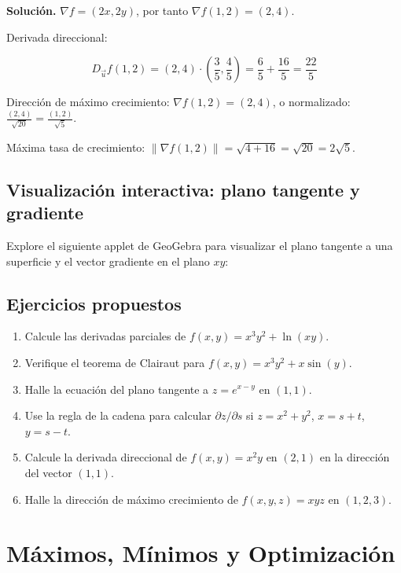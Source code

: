 \documentclass[
]{book}
\providecommand{\tightlist}{%
  \setlength{\itemsep}{0pt}\setlength{\parskip}{0pt}}
\begin{document}
\textbf{Solución.} \(\nabla f = (2x, 2y)\), por tanto \(\nabla f(1, 2) = (2, 4)\).

Derivada direccional:

\[
D_{\vec{u}} f(1, 2) = (2, 4) \cdot \left(\frac{3}{5}, \frac{4}{5}\right) = \frac{6}{5} + \frac{16}{5} = \frac{22}{5}
\]

Dirección de máximo crecimiento: \(\nabla f(1, 2) = (2, 4)\), o normalizado: \(\frac{(2, 4)}{\sqrt{20}} = \frac{(1, 2)}{\sqrt{5}}\).

Máxima tasa de crecimiento: \(\|\nabla f(1, 2)\| = \sqrt{4 + 16} = \sqrt{20} = 2\sqrt{5}\).

\section{Visualización interactiva: plano tangente y gradiente}\label{visualizaciuxf3n-interactiva-plano-tangente-y-gradiente}

Explore el siguiente applet de GeoGebra para visualizar el plano tangente a una superficie y el vector gradiente en el plano \(xy\):

\section{Ejercicios propuestos}\label{ejercicios-propuestos-3}

\begin{enumerate}
\def\labelenumi{\arabic{enumi}.}
\tightlist
\item
  Calcule las derivadas parciales de \(f(x, y) = x^3 y^2 + \ln(xy)\).
\item
  Verifique el teorema de Clairaut para \(f(x, y) = x^3 y^2 + x\sin(y)\).
\item
  Halle la ecuación del plano tangente a \(z = e^{x-y}\) en \((1, 1)\).
\item
  Use la regla de la cadena para calcular \(\partial z / \partial s\) si \(z = x^2 + y^2\), \(x = s + t\), \(y = s - t\).
\item
  Calcule la derivada direccional de \(f(x, y) = x^2 y\) en \((2, 1)\) en la dirección del vector \((1, 1)\).
\item
  Halle la dirección de máximo crecimiento de \(f(x, y, z) = xyz\) en \((1, 2, 3)\).
\end{enumerate}

\chapter{Máximos, Mínimos y Optimización}\label{maximos-minimos}
\end{document}
